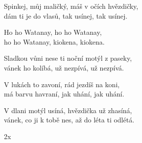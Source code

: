 
\ve{}
Spinkej, můj maličký, máš v očích hvězdičky,\\
dám ti je do vlasů, tak usínej, tak usínej.

\cho{}
Ho ho Watanay, ho ho Watanay,\\
ho ho Watanay, kiokena, kiokena.

\ve{}
Sladkou vůni nese ti noční motýl z paseky,\\
vánek ho kolíbá, už nezpívá, už nezpívá.

\cho{}

\ve{}
V lukách to zavoní, rád jezdíš na koni,\\
má barvu havraní, jak uhání, jak uhání.

\cho{}

\ve{}
V dlani motýl usíná, hvězdička už zhasíná,\\
vánek, co ji k tobě nes, až do léta ti odlétá.

\cho{}
2x

\esong{}